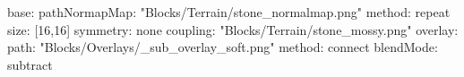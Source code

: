 base:
  pathNormapMap: "Blocks/Terrain/stone_normalmap.png"
  method: repeat
  size: [16,16]
  symmetry: none
  coupling: "Blocks/Terrain/stone_mossy.png"
overlay:
  path: "Blocks/Overlays/_sub_overlay_soft.png"
  method: connect
  blendMode: subtract
